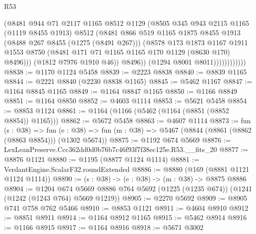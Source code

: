\begin{lexlean}{R53}
\begin{coremodule}
                            (@8481
                              @944
                              @71
                              @2117
                              @1165
                              @8512
                              @1129
                              (@8505
                                @345
                                @943
                                @2115
                                @1165
                                (@1119 @8455 @1913)
                                @8512
                                (@8481
                                  @866
                                  @519
                                  @1165
                                  @1875
                                  @8455
                                  @1913
                                  (@8488 @267 @8455 (@1275 (@8491 @267)))
                                  (@8578
                                    @173
                                    @1873
                                    @1167
                                    @1911
                                    @1553
                                    @8750
                                    (@8481 @171 @71 @1165 @1165 @170 @1129 (@8630 @170) @8496)))
                                (@1812 @7976 @1910 @46))
                              @8496))
                          (@1294 @8001 @8011))))))))))))
@8838 := @1170 @1124 @5458
@8839 := @2223 @8838
@8840 := @8839 @1165
@8844 := @2221 @8840 (@2230 @8838 @1165)
@8845 := @5462 @1167
@8847 := @1164 @8845 @1165
@8849 := @1164 @8847 @1165
@8850 := @1166 @8849
@8851 := @1164 @8850
@8852 := @4603 @1114
@8853 := @5621 @5458
@8854 := @8853 @1124
@8861 := @1164 (@1166 (@5462 (@1164 (@8851 (@8852 @8854)) @1165)))
@8862 := @5672 @5458
@8863 := @4607 @1114
@8873 := fun (s : @38) =>
  fun (e : @38) => fun (m : @38) => @5467 (@8844 (@8861 (@8862 (@8863 @8854))) (@1302 @5674))
@8875 := @1192 @674 @5669
@8876 := LexLeanPreserve.Ccc362dd0d0b76b7c46f93f7f38ec125e.R53.__fits_20
@8877 := @8876 @1121
@8880 := @1195 (@8877 @1124 @1114)
@8881 := VerdantEngine.ScalarF32.roundExtended
@8886 := @8880 (@169 (@8881 @1121 @1124 @1114))
@8890 := (s : @38) -> (e : @38) -> (m : @38) -> @8875 @8886
@8904 := @1204
    @674
    @5669
    @8886
    @764
    @5692
    (@1225 (@1235 @674))
    (@1241 (@1242 (@1243 @764) @5669 @1219))
@8905 := @2270 @5692
@8909 := @8905 @741 @758 @762 @5466
@8910 := @8853 @1121
@8911 := @4604 @8910
@8912 := @8851 @8911
@8914 := @1164 @8912 @1165
@8915 := @5462 @8914
@8916 := @1166 @8915
@8917 := @1164 @8916
@8918 := @5671 @3002

\end{coremodule}
\end{lexlean}
